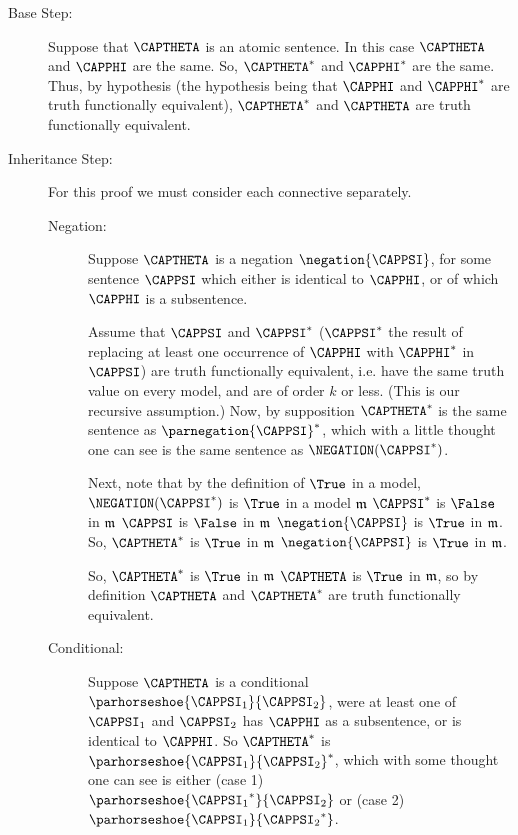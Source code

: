 \begin{PROOF}
\begin{description}
\item[Base Step:] Suppose that $\CAPTHETA$ is an atomic sentence. 
In this case $\CAPTHETA$ and $\CAPPHI$ are the same. 
So, $\CAPTHETA^*$ and $\CAPPHI^*$ are the same. 
Thus, by hypothesis (the hypothesis being that $\CAPPHI$ and $\CAPPHI^*$ are truth functionally equivalent), $\CAPTHETA^*$ and $\CAPTHETA$ are truth functionally equivalent.

\item[Inheritance Step:] For this proof we must consider each connective separately. 
\begin{description}

\item[Negation:] Suppose $\CAPTHETA$ is a negation $\negation{\CAPPSI}$, for some sentence $\CAPPSI$ which either is identical to $\CAPPHI$, or of which $\CAPPHI$ is a subsentence. 

Assume that $\CAPPSI$ and $\CAPPSI^*$ ($\CAPPSI^*$ the result of replacing at least one occurrence of $\CAPPHI$ with $\CAPPHI^*$ in $\CAPPSI$) are truth functionally equivalent, i.e. have the same truth value on every model, and are of order $k$ or less. 
(This is our recursive assumption.)
Now, by supposition $\CAPTHETA^*$ is the same sentence as $\parnegation{\CAPPSI}^*$, which with a little thought one can see is the same sentence as $\NEGATION(\CAPPSI^*)$. 

Next, note that by the definition of $\True$ in a model, $\NEGATION(\CAPPSI^*)$ is $\True$ in a model $\mathfrak{m}$ \Iff $\CAPPSI^*$ is $\False$ in $\mathfrak{m}$ \Iff $\CAPPSI$ is $\False$ in $\mathfrak{m}$ \Iff $\negation{\CAPPSI}$ is $\True$ in $\mathfrak{m}$. So, $\CAPTHETA^*$ is $\True$ in $\mathfrak{m}$ \Iff $\negation{\CAPPSI}$ is $\True$ in $\mathfrak{m}$.

So, $\CAPTHETA^*$ is $\True$ in $\mathfrak{m}$ \Iff $\CAPTHETA$ is $\True$ in $\mathfrak{m}$, so by definition $\CAPTHETA$ and $\CAPTHETA^*$ are truth functionally equivalent.

\item[Conditional:] Suppose $\CAPTHETA$ is a conditional $\parhorseshoe{\CAPPSI_1}{\CAPPSI_2}$, were at least one of $\CAPPSI_1$ and $\CAPPSI_2$ has $\CAPPHI$ as a subsentence, or is identical to $\CAPPHI$. 
So $\CAPTHETA^*$ is $\parhorseshoe{\CAPPSI_1}{\CAPPSI_2}^*$, which with some thought one can see is either (case 1) $\parhorseshoe{{\CAPPSI_1}^*}{\CAPPSI_2}$ or (case 2) $\parhorseshoe{\CAPPSI_1}{{\CAPPSI_2}^*}$.


\end{description}
\end{description}
\end{PROOF}
